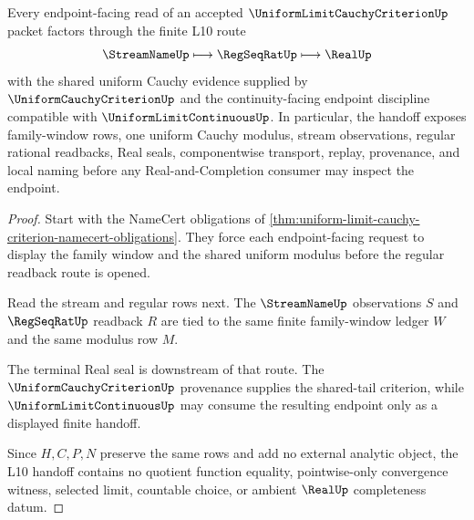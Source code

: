 \begin{theorem}
\label{thm:uniform-limit-cauchy-criterion-l10-handoff}
Every endpoint-facing read of an accepted $\UniformLimitCauchyCriterionUp$ packet factors through the finite L10 route
$$
\StreamNameUp \longmapsto \RegSeqRatUp \longmapsto \RealUp
$$
with the shared uniform Cauchy evidence supplied by $\UniformCauchyCriterionUp$ and the continuity-facing endpoint discipline compatible with $\UniformLimitContinuousUp$. In particular, the handoff exposes family-window rows, one uniform Cauchy modulus, stream observations, regular rational readbacks, Real seals, componentwise transport, replay, provenance, and local naming before any Real-and-Completion consumer may inspect the endpoint.
\end{theorem}
\begin{proof}
Start with the NameCert obligations of \autoref{thm:uniform-limit-cauchy-criterion-namecert-obligations}. They force each endpoint-facing request to display the family window and the shared uniform modulus before the regular readback route is opened.

Read the stream and regular rows next. The $\StreamNameUp$ observations $S$ and $\RegSeqRatUp$ readback $R$ are tied to the same finite family-window ledger $W$ and the same modulus row $M$.

The terminal Real seal is downstream of that route. The $\UniformCauchyCriterionUp$ provenance supplies the shared-tail criterion, while $\UniformLimitContinuousUp$ may consume the resulting endpoint only as a displayed finite handoff.

Since $H,C,P,N$ preserve the same rows and add no external analytic object, the L10 handoff contains no quotient function equality, pointwise-only convergence witness, selected limit, countable choice, or ambient $\RealUp$ completeness datum.
\end{proof}

